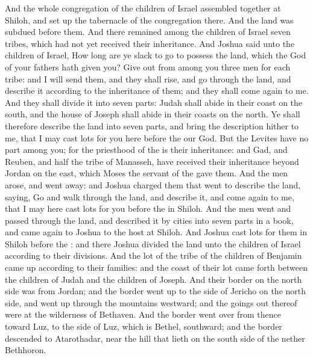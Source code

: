 \begin{biblechapter} %
 And the whole congregation of the children of Israel assembled together at Shiloh, and set up the tabernacle of the congregation there. And the land was subdued before them.
\verse And there remained among the children of Israel seven tribes, which had not yet received their inheritance.
\verse And Joshua said unto the children of Israel, How long are ye slack to go to possess the land, which the \LORD God of your fathers hath given you?
\verse Give out from among you three men for each tribe: and I will send them, and they shall rise, and go through the land, and describe it according to the inheritance of them; and they shall come again to me.
\verse And they shall divide it into seven parts: Judah shall abide in their coast on the south, and the house of Joseph shall abide in their coasts on the north.
\verse Ye shall therefore describe the land into seven parts, and bring the description hither to me, that I may cast lots for you here before the \LORD our God.
\verse But the Levites have no part among you; for the priesthood of the \LORD is their inheritance: and Gad, and Reuben, and half the tribe of Manasseh, have received their inheritance beyond Jordan on the east, which Moses the servant of the \LORD gave them.
\verse And the men arose, and went away: and Joshua charged them that went to describe the land, saying, Go and walk through the land, and describe it, and come again to me, that I may here cast lots for you before the \LORD in Shiloh.
\verse And the men went and passed through the land, and described it by cities into seven parts in a book, and came again to Joshua to the host at Shiloh.
\verse And Joshua cast lots for them in Shiloh before the \LORD: and there Joshua divided the land unto the children of Israel according to their divisions.
 And the lot of the tribe of the children of Benjamin came up according to their families: and the coast of their lot came forth between the children of Judah and the children of Joseph.
\verse And their border on the north side was from Jordan; and the border went up to the side of Jericho on the north side, and went up through the mountains westward; and the goings out thereof were at the wilderness of Bethaven.
\verse And the border went over from thence toward Luz, to the side of Luz, which is Bethel, southward; and the border descended to Atarothadar, near the hill that lieth on the south side of the nether Bethhoron.

\end{biblechapter}
